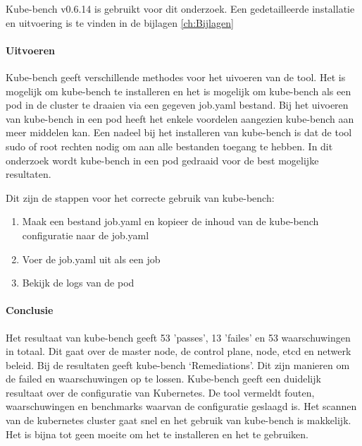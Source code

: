 Kube-bench v0.6.14 is gebruikt voor dit onderzoek. Een gedetailleerde installatie en uitvoering is te vinden in de bijlagen \ref{ch:Bijlagen}

\paragraph{Uitvoeren}
Kube-bench geeft verschillende methodes voor het uivoeren van de tool. Het is mogelijk om kube-bench te installeren en het is mogelijk om kube-bench als een pod in de cluster te draaien via een gegeven job.yaml bestand. 
Bij het uivoeren van kube-bench in een pod heeft het enkele voordelen aangezien kube-bench aan meer middelen kan. Een nadeel bij het installeren van kube-bench is dat de tool sudo of root rechten nodig om aan alle bestanden toegang te hebben.
In dit onderzoek wordt kube-bench in een pod gedraaid voor de best mogelijke resultaten.

Dit zijn de stappen voor het correcte gebruik van kube-bench:
\begin{enumerate}
    \item Maak een bestand job.yaml en kopieer de inhoud van de kube-bench configuratie naar de job.yaml
    \item Voer de job.yaml uit als een job
    \item Bekijk de logs van de pod
\end{enumerate}

\paragraph{Conclusie}
Het resultaat van kube-bench geeft 53 'passes', 13 'failes' en 53 waarschuwingen in totaal. Dit gaat over de master node, de control plane, node, etcd en netwerk beleid. Bij de resultaten geeft kube-bench `Remediations'. Dit zijn manieren om de failed en waarschuwingen op te lossen. Kube-bench geeft een duidelijk resultaat over de configuratie van Kubernetes. De tool vermeldt fouten, waarschuwingen en benchmarks waarvan de configuratie geslaagd is. Het scannen van de kubernetes cluster gaat snel en het gebruik van kube-bench is makkelijk. Het is bijna tot geen moeite om het te installeren en het te gebruiken.

